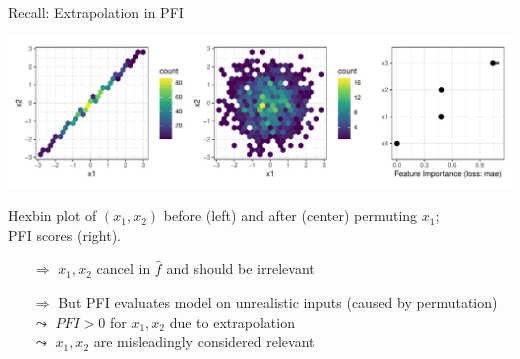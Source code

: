 \documentclass[10pt,compress,t,notes=noshow, xcolor=table]{beamer}
\begin{document}
\begin{frame}{Recall: Extrapolation in PFI}
\centerline{\includegraphics[width=\linewidth]{figure_man/pfi_hexbin_extrapolation.pdf}}

Hexbin plot of $(x_1, x_2)$ before (left) and after (center) permuting $x_1$;  
\\PFI scores (right).

\begin{itemize}
  \item[$\Rightarrow$] $x_1, x_2$ cancel in $\hat{f}$ and should be irrelevant
  \item[$\Rightarrow$] But PFI evaluates model on unrealistic inputs (caused by permutation)\\
  $\leadsto$ $PFI > 0$ for $x_1, x_2$ due to extrapolation\\
  $\leadsto$ $x_1, x_2$ are misleadingly considered relevant
\end{itemize}
 \end{frame}


 
 

\end{document}
